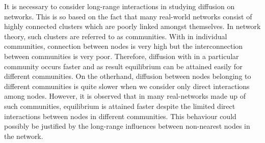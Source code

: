 \documentclass[10pt,a4paper]{article}
\begin{document}
        It is necessary to consider long-range interactions in studying diffusion on networks. This is so based on the fact that many real-world networks consist of highly connected clusters which are poorly linked amongst themselves. In network theory, such clusters are referred to as communities. With in individual communities, connection between nodes is very high but the interconnection between communities is very poor. Therefore, diffusion with in a particular community occurs faster and as result equilibrium can be attained easily for different communities. On the otherhand, diffusion between nodes belonging to different communities is quite slower when we consider only direct interactions among nodes. However, it is observed that in many real-networks made up of such communities, equilibrium is attained faster despite the limited direct interactions between nodes in different communities. This behaviour could possibly be justified by the long-range influences between non-nearest nodes in the network.
        
%        
%        
%        
        
\end{document}
